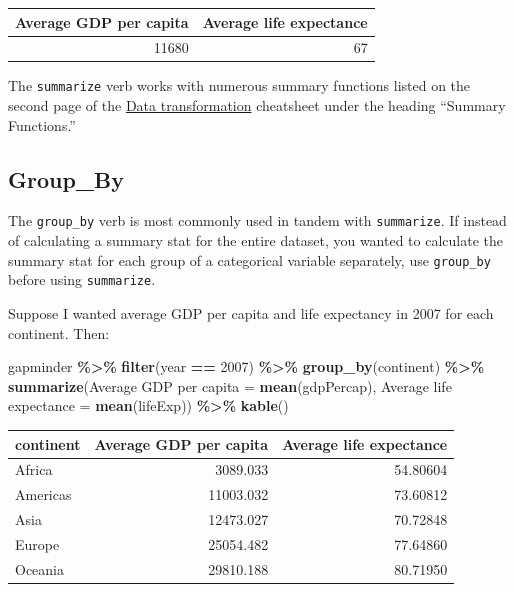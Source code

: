 \documentclass[
]{book}
\makeatletter
\newenvironment{Shaded}{\begin{snugshade}}{\end{snugshade}}
\newcommand{\DecValTok}[1]{\textcolor[rgb]{0.06,0.06,0.06}{#1}}
\newcommand{\FunctionTok}[1]{\textcolor[rgb]{0.27,0.27,0.27}{\textbf{#1}}}
\newcommand{\NormalTok}[1]{#1}
\newcommand{\OtherTok}[1]{\textcolor[rgb]{0.37,0.37,0.37}{#1}}
\newcommand{\SpecialCharTok}[1]{\textcolor[rgb]{0.43,0.43,0.43}{\textbf{#1}}}
\newcommand{\StringTok}[1]{\textcolor[rgb]{0.5,0.5,0.5}{#1}}
\newenvironment{kframe}{%
\medskip{}
\setlength{\fboxsep}{.8em}
 \def\at@end@of@kframe{}%
 \ifinner\ifhmode%
  \def\at@end@of@kframe{\end{minipage}}%
  \begin{minipage}{\columnwidth}%
 \fi\fi%
 \def\FrameCommand##1{\hskip\@totalleftmargin \hskip-\fboxsep
 \colorbox{shadecolor}{##1}\hskip-\fboxsep
     \hskip-\linewidth \hskip-\@totalleftmargin \hskip\columnwidth}%
 \MakeFramed {\advance\hsize-\width
   \@totalleftmargin\z@ \linewidth\hsize
   \@setminipage}}%
 {\par\unskip\endMakeFramed%
 \at@end@of@kframe}
\renewenvironment{Shaded}{\begin{kframe}}{\end{kframe}}
\makeatother
\begin{document}
\begin{tabular}{r|r}
\hline
Average GDP per capita & Average life expectance\\
\hline
11680 & 67\\
\hline
\end{tabular}

The \texttt{summarize} verb works with numerous summary functions listed on the second page of the \href{https://github.com/rstudio/cheatsheets/raw/master/data-transformation.pdf}{Data transformation} cheatsheet under the heading ``Summary Functions.''

\hypertarget{group_by}{%
\subsection{Group\_By}\label{group_by}}

The \texttt{group\_by} verb is most commonly used in tandem with \texttt{summarize}. If instead of calculating a summary stat for the entire dataset, you wanted to calculate the summary stat for each group of a categorical variable separately, use \texttt{group\_by} before using \texttt{summarize}.

Suppose I wanted average GDP per capita and life expectancy in 2007 for each continent. Then:

\begin{Shaded}
\begin{Highlighting}[]
\NormalTok{gapminder }\SpecialCharTok{\%\textgreater{}\%} 
  \FunctionTok{filter}\NormalTok{(year }\SpecialCharTok{==} \DecValTok{2007}\NormalTok{) }\SpecialCharTok{\%\textgreater{}\%} 
  \FunctionTok{group\_by}\NormalTok{(continent) }\SpecialCharTok{\%\textgreater{}\%} 
  \FunctionTok{summarize}\NormalTok{(}\StringTok{\textquotesingle{}Average GDP per capita\textquotesingle{}} \OtherTok{=} \FunctionTok{mean}\NormalTok{(gdpPercap), }
            \StringTok{\textquotesingle{}Average life expectance\textquotesingle{}} \OtherTok{=} \FunctionTok{mean}\NormalTok{(lifeExp)) }\SpecialCharTok{\%\textgreater{}\%} 
  \FunctionTok{kable}\NormalTok{()}
\end{Highlighting}
\end{Shaded}

\begin{tabular}{l|r|r}
\hline
continent & Average GDP per capita & Average life expectance\\
\hline
Africa & 3089.033 & 54.80604\\
\hline
Americas & 11003.032 & 73.60812\\
\hline
Asia & 12473.027 & 70.72848\\
\hline
Europe & 25054.482 & 77.64860\\
\hline
Oceania & 29810.188 & 80.71950\\
\hline
\end{tabular}
\end{document}
